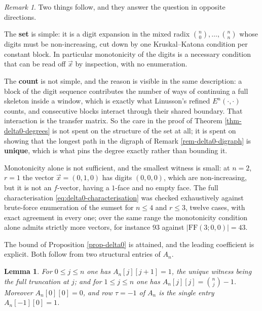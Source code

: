 \documentclass[11pt, a4paper, abstract=yes]{scrartcl}
\theoremstyle{definition}
\theoremstyle{remark}
\newtheorem{remark}[definition]{Remark}
\theoremstyle{plain}
\newtheorem{lemma}[definition]{Lemma}
\begin{document}
\begin{remark}
Two things follow, and they answer the question in opposite directions.

The \textbf{set} is simple: it is a digit expansion in the mixed radix \(\binom n0,\dots,\binom nn\) whose
digits must be non-increasing, cut down by one Kruskal--Katona condition per constant block. In
particular monotonicity of the digits is a necessary condition that can be read off \(\vec x\) by
inspection, with no enumeration.

The \textbf{count} is not simple, and the reason is visible in the same description: a block of the digit
sequence contributes the number of ways of continuing a full skeleton inside a window, which is
exactly what Linusson's refined \(E^n(\cdot,\cdot)\) counts, and consecutive blocks interact through
their shared boundary. That interaction is the transfer matrix. So the care in the proof of
Theorem \ref{thm-delta0-degrees} is not spent on the structure of the set at all; it is spent on showing
that the longest path in the digraph of Remark \ref{rem-delta0-digraph} is \textbf{unique}, which is what pins
the degree exactly rather than bounding it.

Monotonicity alone is not sufficient, and the smallest witness is small: at \(n=2\), \(r=1\) the
vector \(\vec x=(0,1,0)\) has digits \((0,0,0)\), which are non-increasing, but it is not an
\(f\)-vector, having a \(1\)-face and no empty face. The full characterisation
\eqref{eq:delta0-characterisation} was checked exhaustively against brute-force enumeration of the
sumset for \(n\le4\) and \(r\le3\), twelve cases, with exact agreement in every one; over the same
range the monotonicity condition alone admits strictly more vectors, for instance \(93\) against
\(\lvert\mathrm{FF}(3;0,0)\rvert=43\).
\label{rem-delta0-structure}
\end{remark}

The bound of Proposition \ref{prop-delta0} is attained, and the leading coefficient is explicit. Both
follow from two structural entries of \(A_n\).

\begin{lemma}
For \(0\le j\le n\) one has \(A_n[j][j+1]=1\), the unique witness being the full truncation at \(j\);
and for \(1\le j\le n\) one has \(A_n[j][j]=\binom nj-1\). Moreover \(A_n[0][0]=0\), and row \(\tau=-1\)
of \(A_n\) is the single entry \(A_n[-1][0]=1\).
\label{lem-A-structure}
\end{lemma}
\end{document}
